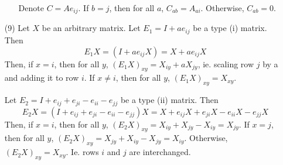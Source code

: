 \documentclass[12pt]{article}
\begin{document}
\begin{itemize}
\begin{itemize}
Denote $C = Ae_{ij}$. If $b = j$, then for all $a$, $C_{ab} = A_{ai}$. Otherwise, $C_{ab} = 0$.
\end{itemize}
\item[(9)]
Let $X$ be an arbitrary matrix. Let $E_1 = I + ae_{ij}$ be a type (i) matrix. Then
$$E_1X = (I + ae_{ij}X) = X + ae_{ij}X$$
Then, if $x = i$, then for all $y$, $(E_1X)_{xy} = X_{iy} + aX_{jy}$, ie. scaling row $j$ by a and adding it to row $i$. If $x \neq i$, then for all $y$, $(E_1X)_{xy} = X_{xy}$.

Let $E_2 = I + e_{ij} + e_{ji} - e_{ii} - e_{jj}$ be a type (ii) matrix. Then
$$E_2X = (I + e_{ij} + e_{ji} - e_{ii} - e_{jj})X = X + e_{ij}X + e_{ji}X - e_{ii}X - e_{jj}X$$
Then, if $x = i$, then for all $y$, $(E_2X)_{xy} = X_{iy} + X_{jy} - X_{iy} = X_{jy}$. If $x = j$, then for all $y$, $(E_2X)_{xy} = X_{jy} + X_{iy} - X_{jy} = X_{iy}$. Otherwise, $(E_2X)_{xy} = X_{xy}$. Ie. rows $i$ and $j$ are interchanged.


\end{itemize}
\end{document}
